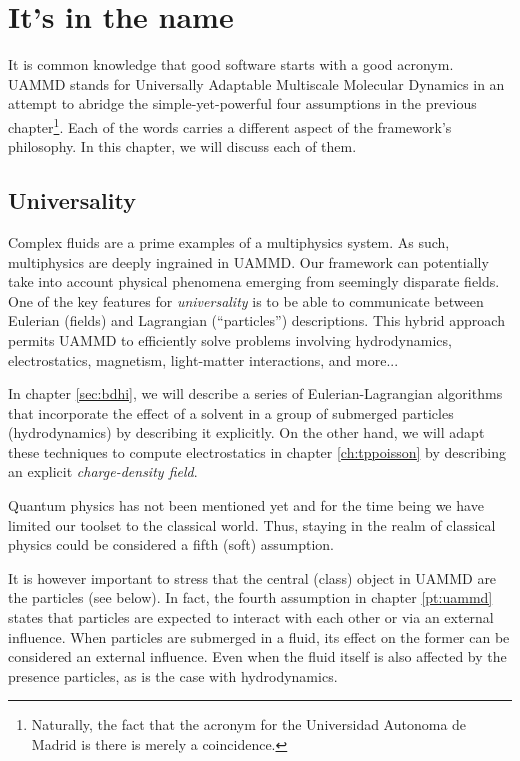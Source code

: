 \documentclass[twoside,openright,titlepage,numbers=noenddot,%
headinclude,footinclude,cleardoublepage=empty,abstract=on,
BCOR=5mm,fontsize=11pt, dvipsnames, paper=b5
]{scrreprt}
\newcommand{\uammd}{\gls{UAMMD}\xspace}
\begin{document}
\chapter{It's in the name}\label{ch:design}

It is common knowledge that good software starts with a good acronym. \uammd stands for Universally Adaptable Multiscale Molecular Dynamics in an attempt to abridge the simple-yet-powerful four assumptions in the previous chapter\footnote{Naturally, the fact that the acronym for the Universidad Autonoma de Madrid is there is merely a coincidence.}. Each of the words carries a different aspect of the framework's philosophy. In this chapter, we will discuss each of them.
\section{\uppercase{\textbf{U}}niversality}

Complex fluids are a prime examples of a multiphysics system. As such, multiphysics are deeply ingrained in \uammd. Our framework can potentially take into account physical phenomena emerging from seemingly disparate fields.
One of the key features for \emph{universality} is to be able to communicate between Eulerian (fields) and Lagrangian (``particles'') descriptions. This hybrid approach permits \uammd to efficiently solve problems involving hydrodynamics, electrostatics, magnetism, light-matter interactions, and more... 
  
In chapter \ref{sec:bdhi}, we will describe a series of Eulerian-Lagrangian algorithms that incorporate the effect of a solvent in a group of submerged particles (hydrodynamics) by describing it explicitly. On the other hand, we will adapt these techniques to compute electrostatics in chapter \ref{ch:tppoisson} by describing an explicit \emph{charge-density field}.

Quantum physics has not been mentioned yet and for the time being we have limited our toolset to the classical world. Thus, staying in the realm of classical physics could be considered a fifth (soft) assumption.

It is however important to stress that the central (class) object in \uammd are the particles (see below). In fact, the fourth assumption in chapter \ref{pt:uammd} states that particles are expected to interact with each other or via an external influence. When particles are submerged in a fluid, its effect on the former can be considered an external influence. Even when the fluid itself is also affected by the presence particles, as is the case with hydrodynamics.
\end{document}
